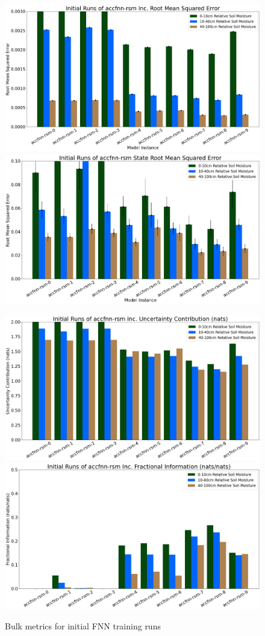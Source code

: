 \begin{figure}[hp!]
    \includegraphics[width=.48\linewidth,draft=false]{figures/efficiency_initial-best/eval_test_efficiency_initial-accfnn-rsm_mse_res.png}
    \includegraphics[width=.48\linewidth,draft=false]{figures/efficiency_initial-best/eval_test_efficiency_initial-accfnn-rsm_mse_state.png}

    \includegraphics[width=.48\linewidth,draft=false]{figures/efficiency_initial-best/eval_test_efficiency_initial-accfnn-rsm_info-loss_res.png}
    \includegraphics[width=.48\linewidth,draft=false]{figures/efficiency_initial-best/eval_test_efficiency_initial-accfnn-rsm_fi_res.png}

    \caption{Bulk metrics for initial FNN training runs}
    \label{model-init-fnn}
\end{figure}

